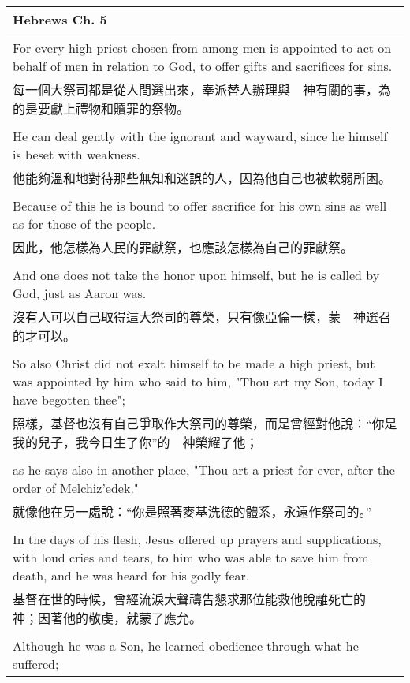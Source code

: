 \newpage

\begin{tabularx}{\textwidth}{p{}}
\hline
Hebrews Ch. 5 \\
\hline \\
For every high priest chosen from among men is appointed to act on behalf of men in relation to God, to offer gifts and sacrifices for sins. \\
每一個大祭司都是從人間選出來，奉派替人辦理與　神有關的事，為的是要獻上禮物和贖罪的祭物。 \\ \\
He can deal gently with the ignorant and wayward, since he himself is beset with weakness. \\
他能夠溫和地對待那些無知和迷誤的人，因為他自己也被軟弱所困。 \\ \\
Because of this he is bound to offer sacrifice for his own sins as well as for those of the people. \\
因此，他怎樣為人民的罪獻祭，也應該怎樣為自己的罪獻祭。 \\ \\
And one does not take the honor upon himself, but he is called by God, just as Aaron was. \\
沒有人可以自己取得這大祭司的尊榮，只有像亞倫一樣，蒙　神選召的才可以。 \\ \\
So also Christ did not exalt himself to be made a high priest, but was appointed by him who said to him, "Thou art my Son, today I have begotten thee"; \\
照樣，基督也沒有自己爭取作大祭司的尊榮，而是曾經對他說：“你是我的兒子，我今日生了你”的　神榮耀了他； \\ \\
as he says also in another place, "Thou art a priest for ever, after the order of Melchiz'edek." \\
就像他在另一處說：“你是照著麥基洗德的體系，永遠作祭司的。” \\ \\
In the days of his flesh, Jesus offered up prayers and supplications, with loud cries and tears, to him who was able to save him from death, and he was heard for his godly fear. \\
基督在世的時候，曾經流淚大聲禱告懇求那位能救他脫離死亡的　神；因著他的敬虔，就蒙了應允。 \\ \\
Although he was a Son, he learned obedience through what he suffered; \\

\end{tabularx}
